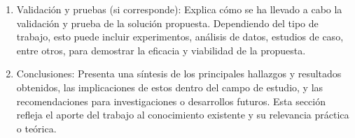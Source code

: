 \begin{enumerate}
    \item Validación y pruebas (si corresponde): Explica cómo se ha llevado a cabo la validación y prueba de la solución propuesta. Dependiendo del tipo de trabajo, esto puede incluir experimentos, análisis de datos, estudios de caso, entre otros, para demostrar la eficacia y viabilidad de la propuesta. 
    \item Conclusiones: Presenta una síntesis de los principales hallazgos y resultados obtenidos, las implicaciones de estos dentro del campo de estudio, y las recomendaciones para investigaciones o desarrollos futuros. Esta sección refleja el aporte del trabajo al conocimiento existente y su relevancia práctica o teórica. 
\end{enumerate}